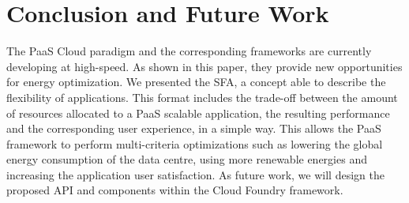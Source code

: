 \section{Conclusion and Future Work}
\label{sec: conclusion}

The PaaS Cloud paradigm and the corresponding frameworks are currently developing at high-speed.
As shown in this paper, they provide new opportunities for energy optimization.
We presented the SFA, a concept able to describe the flexibility of applications.
This format includes the trade-off between the amount of resources allocated to a PaaS scalable application, the resulting performance and the corresponding user experience, in a simple way.
This allows the PaaS framework to perform multi-criteria optimizations such as lowering the global energy consumption of the data centre, using more renewable energies and increasing the application user satisfaction.
As future work, we will design the proposed API and components within the Cloud Foundry framework.
